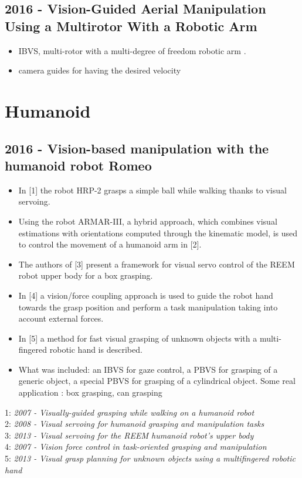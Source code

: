 \subsection{2016 - Vision-Guided Aerial Manipulation Using a Multirotor With a Robotic Arm}
\begin{itemize}
\item IBVS, multi-rotor with a multi-degree of freedom robotic arm . 
\item camera guides for having the desired velocity
\end{itemize}

\vspace{3cm}

\section{Humanoid} \label{humanoid}
\subsection{2016 - Vision-based manipulation with the humanoid robot Romeo}
\begin{itemize}
\item In [1] the robot HRP-2 grasps a simple ball while walking thanks to visual servoing.
\item Using the robot ARMAR-III, a hybrid approach, which combines visual estimations with orientations computed through the kinematic model, is used to control the movement of a humanoid arm in [2]. 
\item The authors of [3] present a framework for visual servo
control of the REEM robot upper body for a box grasping.
\item In [4] a vision/force coupling approach is used to guide the robot hand towards the grasp position and perform a task manipulation taking into account external forces.
\item In [5] a method for fast visual grasping of unknown objects with a multi-fingered robotic hand is described.
\item  What was included: an IBVS for gaze control, a PBVS for grasping of a generic object, a special PBVS for grasping of a cylindrical object. Some real application : box grasping, can grasping
\end{itemize}
1: \textit{2007 - Visually-guided grasping while walking on a humanoid robot} \\
2: \textit{2008 - Visual servoing for humanoid grasping and manipulation tasks} \\
3: \textit{2013 - Visual servoing for the REEM humanoid robot’s upper body} \\
4: \textit{2007 - Vision force control in task-oriented grasping and manipulation} \\
5: \textit{2013 - Visual grasp planning for unknown objects using a multifingered robotic hand}

